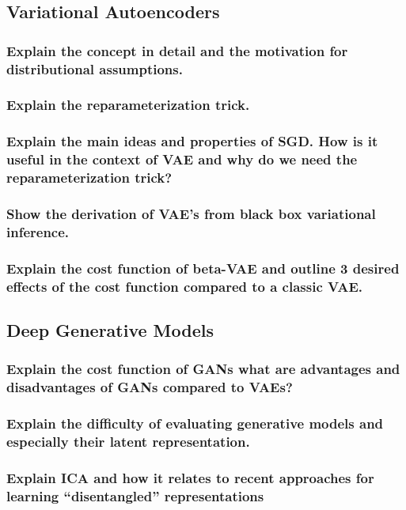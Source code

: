 \documentclass{article}
\begin{document}
\subsection{Variational Autoencoders}

\subsubsection{Explain the concept in detail and the motivation for distributional assumptions.}

\subsubsection{Explain the reparameterization trick.}

\subsubsection{Explain the main ideas and properties of SGD. How is it useful in the context of VAE and why do we need the reparameterization trick?}

\subsubsection{Show the derivation of VAE's from black box variational inference.}

\subsubsection{Explain the cost function of beta-VAE and outline 3 desired effects of the cost function compared to a classic VAE.}




\subsection{Deep Generative Models}

\subsubsection{Explain the cost function of GANs what are advantages and disadvantages of GANs compared to VAEs?}

\subsubsection{Explain the difficulty of evaluating generative models and especially their latent representation.}

\subsubsection{Explain ICA and how it relates to recent approaches for learning ``disentangled'' representations}




%
%
\end{document}
